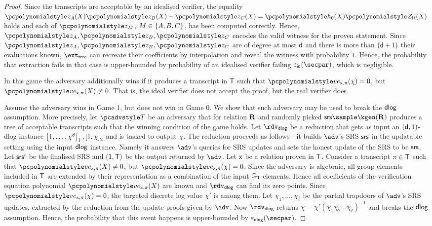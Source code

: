 \begin{proof}
	Since the transcripts are acceptable by an idealised verifier, the equality
	$\p{z_A} (X) \p{z_B} (X) - \p{z_C} (X) = \p{h_0} (X) \ZERO_\HHH (X)$ holds and
	each of $\p{z}_M$, $M \in \{A, B, C\}$, has been computed
	correctly. Hence, $\p{z_A}, \p{z_B}, \p{z_C}$ encodes the valid witness for
	the proven statement. Since $\p{z_A}, \p{z_B}, \p{z_C}$ are of degree at most
	$\mathsf{d}$ and there is more than $(\mathsf{d} + 1)$ their evaluations
	known, $\extt$ can recreate their coefficients by interpolation and reveal the
	witness with probability $1$. Hence, the probability that extraction fails in
	that case is upper-bounded by probability of an idealised verifier failing
	$\epsid(\secpar)$, which is negligible.
	
	 In this game the adversary additionally wins if it produces a
	transcript in $\mathsf{T}$ such that $\vereq_{\inp, \zkproof}(\chi) = 0$, but
	$\vereq_{\inp, \zkproof}(X) \neq 0$. That is, the ideal verifier does not
	accept the proof, but the real verifier does.
	
	 Assume the adversary wins in Game 1, but
	does not win in Game 0. We show that such adversary may be used to break the
	$\mathsf{dlog}$ assumption. More precisely, let $\tdv$ be an adversary that for
	relation $\mathbf{R}$ and randomly picked $\srs \sample \kgen(\REL)$ produces a tree
	of acceptable transcripts such that the winning condition of the game
	holds. Let $\rdvdlog$ be a reduction that gets as input an
	$(\mathsf{d}, 1)$-dlog instance $\left[1, \ldots, \chi^{\mathsf{d}}\right]_{1}, \left[1, \chi\right]_{2}$ and
	is tasked to output $\chi$. The reduction proceeds as follows---it builds $\adv$'s SRS $\mathsf{srs}$ in the updatable setting using the input $\mathsf{dlog}$ instance. Namely it answers $\adv$'s queries for SRS updates and sets the honest update of the SRS to be $\mathsf{srs}$. Let $\mathsf{srs}'$ be the finalised SRS and $(1, \mathsf{T})$ be the output
	returned by $\adv$. Let $\mathsf{x}$ be a relation proven in $\mathsf{T}$.  Consider a
	transcript $\pi \in \mathsf{T}$ such that $\vereq_{\inp, \zkproof}(X) \neq 0$,
	but $\vereq_{\inp, \zkproof}(\chi) = 0$. Since the adversary is algebraic, all
	group elements included in $\mathsf{T}$ are extended by their representation as a
	combination of the input $\mathbb{G}_1$-elements. Hence all coefficients of the
	verification equation polynomial $\vereq_{\inp, \zkproof}(X)$ are known and
	$\rdvdlog$ can find its zero points. Since
	$\vereq_{\inp, \zkproof}(\chi) = 0$, the targeted discrete log value $\chi'$ is
	among them.  Let $\chi_1, \ldots, \chi_\ell$ be the partial trapdoors of $\adv$'s SRS updates,  extracted by the reduction from the update proofs given by $\adv$. Now $\rdvdlog$ returns $\chi = \chi' (\chi_1 \chi_2 \ldots \chi_\ell)^{-1}$ and breaks the $\mathsf{dlog}$ assumption. Hence, the probability that this event happens is upper-bounded
	by $\epsdlog(\secpar)$.
	
\end{proof}

